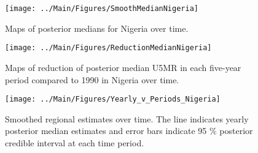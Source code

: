 \documentclass[12pt]{article}\usepackage[]{graphicx}\usepackage[]{color}
\newenvironment{knitrout}{}{} %
\begin{document}
\begin{knitrout}
\color{fgcolor}\begin{figure}[bht]

{\centering \texttt{[image: ../Main/Figures/SmoothMedianNigeria]} 

}

\caption[Maps of posterior medians for Nigeria  over time]{Maps of posterior medians for Nigeria  over time.}\label{fig:unnamed-chunk-264}
\end{figure}


\end{knitrout}
\begin{knitrout}
\color{fgcolor}\begin{figure}[bht]

{\centering \texttt{[image: ../Main/Figures/ReductionMedianNigeria]} 

}

\caption[Maps of reduction of posterior median U5MR in each five-year period compared to 1990 in Nigeria over time]{Maps of reduction of posterior median U5MR in each five-year period compared to 1990 in Nigeria over time.}\label{fig:unnamed-chunk-265}
\end{figure}


\end{knitrout}
\begin{knitrout}
\color{fgcolor}\begin{figure}[bht]

{\centering \texttt{[image: ../Main/Figures/Yearly\_v\_Periods\_Nigeria]} 

}

\caption[Smoothed regional estimates over time]{Smoothed regional estimates over time. The line indicates yearly posterior median estimates and error bars indicate 95 \% posterior credible interval at each time period.}\label{fig:unnamed-chunk-266}
\end{figure}


\end{knitrout}
\end{document}
